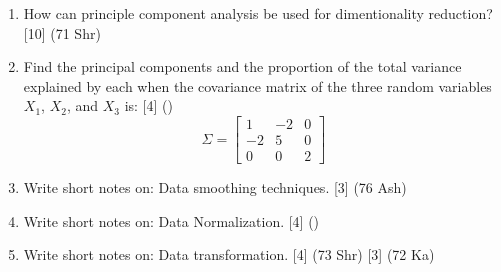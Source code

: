 \documentclass[12pt]{article}
\begin{document}
\begin{enumerate}[topsep=0pt, noitemsep]
      \item How can principle component analysis be used for dimentionality reduction? \hfill [10] (71 Shr)

      \item Find the principal components and the proportion of the total variance explained by each when the covariance matrix of the three random variables $X_1$, $X_2$, and $X_3$ is: \hfill [4] ()
        \[ \Sigma = \begin{bmatrix} 1 & -2 & 0 \\ -2 & 5 & 0 \\ 0 & 0 & 2 \end{bmatrix} \]

      \item Write short notes on: Data smoothing techniques. \hfill [3] (76 Ash)

      \item Write short notes on: Data Normalization. \hfill [4] ()

      \item Write short notes on: Data transformation. \hfill [4] (73 Shr) [3] (72 Ka)
    \end{enumerate}
\end{document}
